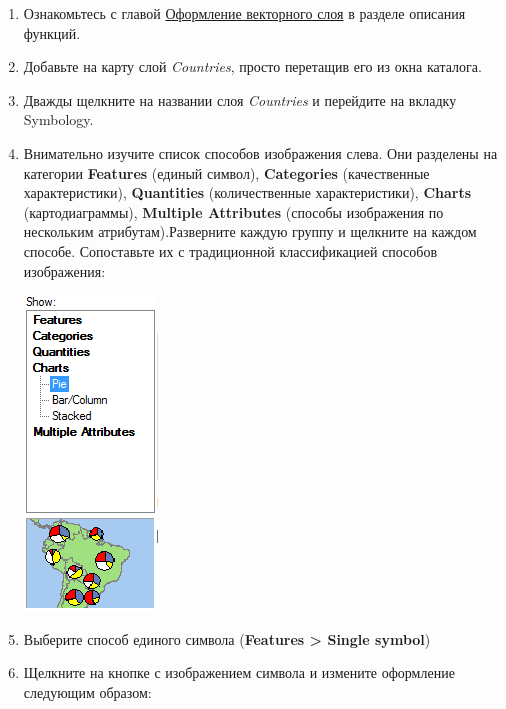 \documentclass[12pt,]{book}
\begin{document}
\begin{enumerate}
\def\labelenumi{\arabic{enumi}.}
\item
  Ознакомьтесь с главой \protect\hyperlink{manual-vector}{Оформление векторного слоя} в разделе описания функций.
\item
  Добавьте на карту слой \emph{Countries}, просто перетащив его из окна каталога.
\item
  Дважды щелкните на названии слоя \emph{Countries} и перейдите на вкладку Symbology.
\item
  Внимательно изучите список способов изображения слева. Они разделены на категории \textbf{Features} (единый символ), \textbf{Categories} (качественные характеристики), \textbf{Quantities} (количественные характеристики), \textbf{Charts} (картодиаграммы), \textbf{Multiple Attributes} (способы изображения по нескольким атрибутам).Разверните каждую группу и щелкните на каждом способе. Сопоставьте их с традиционной классификацией способов изображения:

  \includegraphics{images/Ex03/image12.png}
\item
  Выберите способ единого символа (\textbf{Features \textgreater{} Single symbol})
\item
  Щелкните на кнопке с изображением символа и измените оформление следующим образом:


\end{enumerate}
\end{document}
